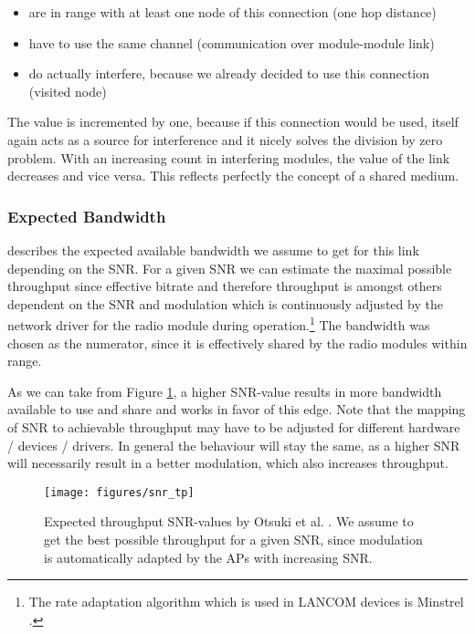 	\begin{itemize}
	\item are in range with at least one node of this connection (one hop distance)
	\item have to use the same channel (communication over module-module link)
	\item do actually interfere, because we already decided to use this connection (visited node)
	\end{itemize}

	The value is incremented by one, because if this connection would be used, itself again acts as a source for interference and it nicely solves the division by zero problem.
	With an increasing count in interfering modules, the value of the link decreases and vice versa. This reflects perfectly the concept of a shared medium.

      \subsubsection{Expected Bandwidth}
	describes the expected available bandwidth we assume to get for this link depending on the \ac{SNR}.
	For a given \ac{SNR} we can estimate the maximal possible throughput since effective bitrate and therefore throughput is amongst others dependent on the \ac{SNR}
	and modulation which is continuously adjusted by the network driver for the radio module during operation.\footnote{The rate adaptation algorithm 
	which is used in LANCOM devices is Minstrel \cite{minstrel}.} 
	The bandwidth was chosen as the numerator, since it is effectively shared by the radio modules within range.
	
	As we can take from Figure \ref{fig:snr_tp}, a higher \ac{SNR}-value results in more bandwidth available to use and share and works in favor of this edge.
	Note that the mapping of \ac{SNR} to achievable throughput may have to be adjusted for different hardware / devices / drivers. 
	In general the behaviour will stay the same, as a higher \ac{SNR} will necessarily result in a better modulation, which also increases throughput.
	
	\begin{figure}[h!]
	  \centering
	  \texttt{[image: figures/snr\_tp]}
	  \caption{Expected throughput \ac{SNR}-values by Otsuki et al. \cite{expected_snr}.
	    We assume to get the best possible throughput for a given \ac{SNR}, since modulation is automatically adapted by the APs with increasing \ac{SNR}.}
	  \label{fig:snr_tp}
	\end{figure}
	
